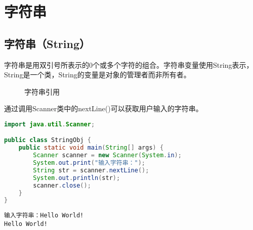 \newpage

\section{字符串}

\subsection{字符串（String）}

字符串是用双引号所表示的0个或多个字符的组合。字符串变量使用String表示，String是一个类，String的变量是对象的管理者而非所有者。

\begin{figure}[H]
	\centering
	\caption{字符串引用}
\end{figure}

通过调用Scanner类中的nextLine()可以获取用户输入的字符串。 \\


\begin{lstlisting}[language=Java]
import java.util.Scanner;

public class StringObj {
	public static void main(String[] args) {
		Scanner scanner = new Scanner(System.in);
		System.out.print("输入字符串：");
		String str = scanner.nextLine();
		System.out.println(str);
		scanner.close();
	}
}
\end{lstlisting}

\begin{tcolorbox}
	\begin{verbatim}
输入字符串：Hello World!
Hello World!
	\end{verbatim}
\end{tcolorbox}

